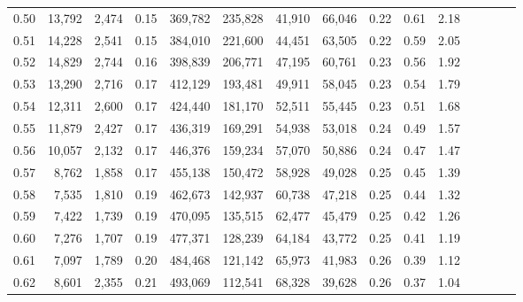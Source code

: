 \begin{tabular}{rrrcrrrrrrrrrrr}
0.50 &  13,792 &  2,474 &                                       0.15 &  369,782 &  235,828 &   41,910 &   66,046 &  0.22 &  0.61 &                         2.18 \\
0.51 &  14,228 &  2,541 &                                       0.15 &  384,010 &  221,600 &   44,451 &   63,505 &  0.22 &  0.59 &                         2.05 \\
0.52 &  14,829 &  2,744 &                                       0.16 &  398,839 &  206,771 &   47,195 &   60,761 &  0.23 &  0.56 &                         1.92 \\
0.53 &  13,290 &  2,716 &                                       0.17 &  412,129 &  193,481 &   49,911 &   58,045 &  0.23 &  0.54 &                         1.79 \\
0.54 &  12,311 &  2,600 &                                       0.17 &  424,440 &  181,170 &   52,511 &   55,445 &  0.23 &  0.51 &                         1.68 \\
0.55 &  11,879 &  2,427 &                                       0.17 &  436,319 &  169,291 &   54,938 &   53,018 &  0.24 &  0.49 &                         1.57 \\
0.56 &  10,057 &  2,132 &                                       0.17 &  446,376 &  159,234 &   57,070 &   50,886 &  0.24 &  0.47 &                         1.47 \\
0.57 &   8,762 &  1,858 &                                       0.17 &  455,138 &  150,472 &   58,928 &   49,028 &  0.25 &  0.45 &                         1.39 \\
0.58 &   7,535 &  1,810 &                                       0.19 &  462,673 &  142,937 &   60,738 &   47,218 &  0.25 &  0.44 &                         1.32 \\
0.59 &   7,422 &  1,739 &                                       0.19 &  470,095 &  135,515 &   62,477 &   45,479 &  0.25 &  0.42 &                         1.26 \\
0.60 &   7,276 &  1,707 &                                       0.19 &  477,371 &  128,239 &   64,184 &   43,772 &  0.25 &  0.41 &                         1.19 \\
0.61 &   7,097 &  1,789 &                                       0.20 &  484,468 &  121,142 &   65,973 &   41,983 &  0.26 &  0.39 &                         1.12 \\
0.62 &   8,601 &  2,355 &                                       0.21 &  493,069 &  112,541 &   68,328 &   39,628 &  0.26 &  0.37 &                         1.04 \\

\end{tabular}
